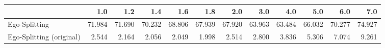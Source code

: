 \begin{tabular}{lrrrrrrrrrrr}
\toprule
{} &    1.0 &    1.2 &    1.4 &    1.6 &    1.8 &    2.0 &    3.0 &    4.0 &    5.0 &    6.0 &    7.0 \\
\midrule
Ego-Splitting            & 71.984 & 71.690 & 70.232 & 68.806 & 67.939 & 67.920 & 63.963 & 63.484 & 66.032 & 70.277 & 74.927 \\
Ego-Splitting (original) &  2.544 &  2.164 &  2.056 &  2.049 &  1.998 &  2.514 &  2.800 &  3.836 &  5.306 &  7.074 &  9.261 \\
\bottomrule
\end{tabular}

